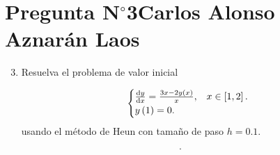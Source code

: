 \section{Pregunta N$^{\circ}$3\qquad Carlos Alonso Aznarán Laos}



\begin{frame}
    \begin{enumerate}\setcounter{enumi}{2}
        \item

              Resuelva el problema de valor inicial

              \begin{equation*}
                  \begin{cases}
                      \diff{y}{x}=\frac{3x-2y\left(x\right)}{x},
                       & x\in\left[1,2\right]. \\
                      y\left(1\right)=0.
                       &
                  \end{cases}
              \end{equation*}
              usando el método de Heun con tamaño de paso $h=0.1$.
    \end{enumerate}

    \begin{solution}

        \begin{equation*}
            .
        \end{equation*}
    \end{solution}
\end{frame}